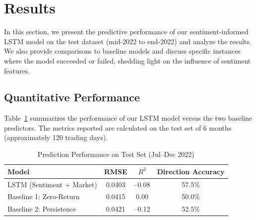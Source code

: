 \documentclass[conference]{IEEEtran}
\begin{document}
\section{Results}
In this section, we present the predictive performance of our sentiment-informed LSTM model on the test dataset (mid-2022 to end-2022) and analyze the results. We also provide comparisons to baseline models and discuss specific instances where the model succeeded or failed, shedding light on the influence of sentiment features.

\subsection{Quantitative Performance}
Table~\ref{tab:performance} summarizes the performance of our LSTM model versus the two baseline predictors. The metrics reported are calculated on the test set of 6 months (approximately 120 trading days).

\begin{table}[ht]
	\caption{Prediction Performance on Test Set (Jul--Dec 2022)}
	\label{tab:performance}
	\centering
	\begin{tabular}{l|c|c|c}
		\hline
		Model                     & RMSE   & $R^2$  & Direction Accuracy \\
		\hline
		LSTM (Sentiment + Market) & 0.0403 & --0.08 & 57.5\%             \\
		Baseline 1: Zero-Return   & 0.0415 & 0.00   & 50.0\%             \\
		Baseline 2: Persistence   & 0.0421 & --0.12 & 52.5\%             \\
		\hline
	\end{tabular}
\end{table}
\end{document}
